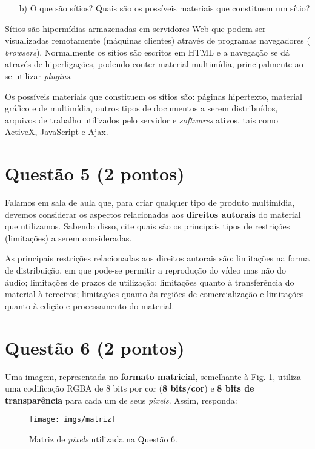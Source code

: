 \documentclass[a4paper,11pt]{article}
\begin{document}
\begin{itemize}
    \item[b)] O que são sítios? Quais são os possíveis materiais que constituem
um sítio?
\end{itemize}

Sítios são hipermídias armazenadas em servidores Web que podem ser visualizadas
remotamente (máquinas clientes) através de programas navegadores ({\it
browsers}). Normalmente os sítios são escritos em HTML e a navegação se dá
através de hiperligações, podendo conter material multimídia, principalmente ao
se utilizar {\it plugins}.

Os possíveis materiais que constituem os sítios são: páginas hipertexto,
material gráfico e de multimídia, outros tipos de documentos a serem
distribuídos, arquivos de trabalho utilizados pelo servidor e {\it softwares}
ativos, tais como ActiveX, JavaScript e Ajax.

\pagebreak

\section*{Questão 5 (2 pontos)}
Falamos em sala de aula que, para criar qualquer tipo de produto multimídia,
devemos considerar os aspectos relacionados aos {\bf direitos autorais} do
material que utilizamos. Sabendo disso, cite quais são os principais tipos de
restrições (limitações) a serem consideradas.

\vspace{0.25cm}

As principais restrições relacionadas aos direitos autorais são: limitações na
forma de distribuição, em que pode-se permitir a reprodução do vídeo mas não do
áudio; limitações de prazos de utilização; limitações quanto à transferência do
material à terceiros; limitações quanto às regiões de comercialização e
limitações quanto à edição e processamento do material.

\pagebreak

\section*{Questão 6 (2 pontos)}
Uma imagem, representada no {\bf formato matricial}, semelhante à Fig.
\ref{fig:matriz}, utiliza uma codificação RGBA de 8 bits por cor ({\bf 8
bits/cor}) e {\bf 8 bits de transparência} para cada um de seus {\it pixels}.
Assim, responda:

\begin{figure}[H]
\centering
\texttt{[image: imgs/matriz]}
\caption{Matriz de {\it pixels} utilizada na Questão 6.}
\label{fig:matriz}
\end{figure}
\end{document}
